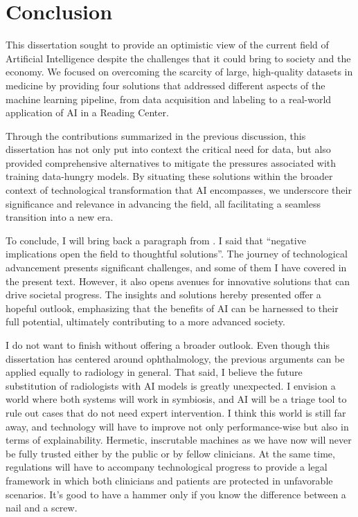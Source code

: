 \graphicspath{{ch8_conclusion/}{Figures/}}

\chapter{Conclusion}
\label{chapter:conclusion}




This dissertation sought to provide an optimistic view of the current field of Artificial Intelligence despite the challenges that it could bring to society and the economy. We focused on overcoming the scarcity of large, high-quality datasets in medicine by providing four solutions that addressed different aspects of the machine learning pipeline, from data acquisition and labeling to a real-world application of AI in a Reading Center.

Through the contributions summarized in the previous discussion, this dissertation has not only put into context the critical need for data, but also provided comprehensive alternatives to mitigate the pressures associated with training data-hungry models. By situating these solutions within the broader context of technological transformation that AI encompasses, we underscore their significance and relevance in advancing the field, all facilitating a seamless transition into a new era.

To conclude, I will bring back a paragraph from . I said that ``negative implications open the field to thoughtful solutions''. The journey of technological advancement presents significant challenges, and some of them I have covered in the present text. However, it also opens avenues for innovative solutions that can drive societal progress. The insights and solutions hereby presented offer a hopeful outlook, emphasizing that the benefits of AI can be harnessed to their full potential, ultimately contributing to a more advanced society. 

I do not want to finish without offering a broader outlook. Even though this dissertation has centered around ophthalmology, the previous arguments can be applied equally to radiology in general. That said, I believe the future substitution of radiologists with AI models is greatly unexpected. I envision a world where both systems will work in symbiosis, and AI will be a triage tool to rule out cases that do not need expert intervention. I think this world is still far away, and technology will have to improve not only performance-wise but also in terms of explainability. Hermetic, inscrutable machines as we have now will never be fully trusted either by the public or by fellow clinicians. At the same time, regulations will have to accompany technological progress to provide a legal framework in which both clinicians and patients are protected in unfavorable scenarios. It's good to have a hammer only if you know the difference between a nail and a screw.

